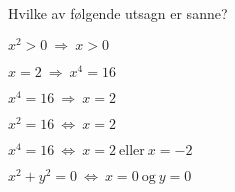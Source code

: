 \documentclass[a4paper,11pt]{article}
\begin{document}
\newpageLF


\begin{problem}[5]
  Hvilke av følgende utsagn er sanne?
  \begin{subproblem}
    \label{subproblem:1.8-5a-oving-02-2019-MAT-0001}
    $x^2 > 0 \ \Longrightarrow \ x > 0$ \UiTwrong
  \end{subproblem}
  \begin{subproblem}
    \label{subproblem:1.8-5b-oving-02-2019-MAT-0001}
    $x = 2 \ \Longrightarrow \ x^4 = 16$ \UiTcorrect
  \end{subproblem}
  \begin{subproblem}
    \label{subproblem:1.8-5c-oving-02-2019-MAT-0001}
    $x^4 = 16 \ \Longrightarrow \ x = 2$ \UiTwrong
  \end{subproblem}
  \begin{subproblem}
    \label{subproblem:1.8-5d-oving-02-2019-MAT-0001}
    $x^2 = 16 \ \Longleftrightarrow \ x = 2$ \UiTwrong
  \end{subproblem}
  \begin{subproblem}
    \label{subproblem:1.8-5e-oving-02-2019-MAT-0001}
    $x^4 = 16 \ \Longleftrightarrow \ x = 2 \ \text{eller} \ x = -2$ \UiTcorrect
  \end{subproblem}
  \begin{subproblem}
    \label{subproblem:1.8-5f-oving-02-2019-MAT-0001}
    $x^2 + y^2 = 0 \ \Longleftrightarrow \ x = 0 \ \text{og} \ y = 0$ \UiTcorrect
  \end{subproblem}
\end{problem}
\end{document}
